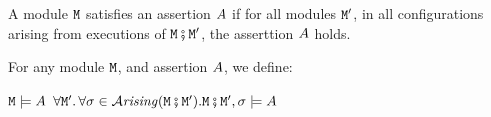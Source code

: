 A module $\M$ satisfies an assertion $\A$ if for all modules $\M'$, in all configurations arising from executions of $\M\mkpair\M'$, the asserttion $\A$ holds.

\begin{definition}
\label{def:module_satisfies}
For any module $\M$, and  assertion $\A$, we define:

$\M \models \A$ \IFF  $\forall \M'.\, \forall \sigma\in \Arising{\M\mkpair\M'}.   \M\mkpair\M', \sigma \models \A$
\end{definition}

